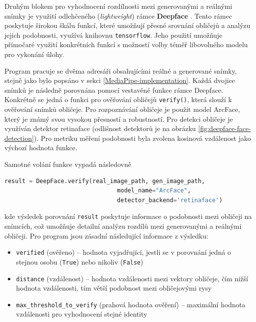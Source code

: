 Druhým blokem pro vyhodnocení rozdílnosti mezi generovanými a reálnými snímky je využití odlehčeného (\textit{lightweight}) rámce \textbf{Deepface} \cite{serengil2020lightface}. Tento rámec poskytuje širokou škálu funkcí, které umožňují přesné srovnání obličejů a analýzu jejich podobnosti, využívá knihovnu \texttt{tensorflow}. Jeho použití umožňuje přímočaré využití konkrétních funkcí s možností volby téměř libovolného modelu pro vykonání úlohy.

Program pracuje se dvěma adresáři obsahujícími reálné a generované snímky, stejně jako bylo popsáno v sekci \ref{MediaPipe-implementation}. Každá dvojice snímků je následně porovnána pomocí vestavěné funkce rámce Deepface. Konkrétně se jedná o funkci pro ověřování obličejů \texttt{verify()}, která slouží k ověřování snímků obličeje. Pro rozpoznávání obličeje je použit model ArcFace, který je známý svou vysokou přesností a robustností. Pro detekci obličeje je využíván detektor retinaface (odlišnost detektorů je na obrázku \ref{fig:deepface-face-detection}). Pro metriku měření podobnosti byla zvolena kosinová vzdálenost jako výchozí hodnota funkce.

\bigskip

\noindent Samotné volání funkce vypadá následovně

\begin{lstlisting}[language=Python]
    result = DeepFace.verify(real_image_path, gen_image_path,
                                model_name="ArcFace",
                                detector_backend='retinaface')
\end{lstlisting}

kde výsledek porovnání \texttt{result} poskytuje informace o podobnosti mezi obličeji na snímcích, což umožňuje detailní analýzu rozdílů mezi generovanými a reálnými obličeji. Pro program jsou zásadní následující informace z výsledku:

\begin{itemize}
    \item \texttt{verified} (ověřeno) -- hodnota vyjadřující, jestli se v porovnání jedná o stejnou osobu (\texttt{True}) nebo nikoliv (\texttt{False})
    \item \texttt{distance} (vzdálenost) -- hodnota vzdálenosti mezi vektory obličeje, čím nižší hodnota vzdálenosti, tím větší podobnost mezi obličejovými rysy
    \item \texttt{max\_threshold\_to\_verify} (prahová hodnota ověření) -- maximální hodnota vzdálenosti pro vyhodnocení stejné identity
\end{itemize}

